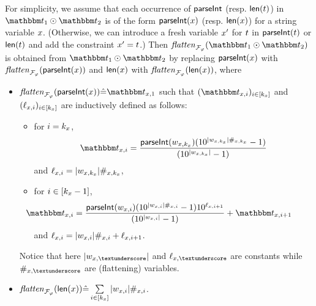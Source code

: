 For simplicity, we assume that each occurrence of $\textsf{parseInt}$ (resp. $\textsf{len}(t)$) in $\iterm_1 \op \iterm_2$ is of the form $\textsf{parseInt}(x)$ (resp. $\textsf{len}(x)$) for a string variable $x$. (Otherwise, we can introduce a fresh variable $x'$ for $t$ in $\textsf{parseInt}(t)$ or $\textsf{len}(t)$ and add the constraint $x' = t$.)
Then $\flatten_{\flatfun_\varphi}(\iterm_1 \op \iterm_2)$ is obtained from $\iterm_1 \op \iterm_2$ by replacing $\textsf{parseInt}(x)$ with $\mathit{flatten}_{\mathcal{F}_\varphi}(\textsf{parseInt}(x))$ and $\textsf{len}(x)$ with $\mathit{flatten}_{\mathcal{F}_\varphi}(\textsf{len}(x))$, where 
\begin{itemize}
\item 
$\flatten_{\flatfun_\varphi}(\parseInt(\svarx)) \Def \iterm_{\svarx,1}$  such that $(\iterm_{\svarx, i})_{i \in [k_\svarx]}$ and $(\ell_{x, i})_{i \in [k_x]}$ are inductively defined as follows: 
\begin{itemize}
\item for $i = k_x$, 
$$\iterm_{\svarx, i} = \frac{\parseInt(w_{\svarx, k_\svarx}) (10^{\vert w_{\svarx,k_\svarx}\vert  \#_{\svarx, k_\svarx} } -1 )}{(10^{\vert w_{\svarx, k_\svarx}\vert } -1 )}$$ 
and $\ell_{x, i} = \vert w_{x,k_x}\vert  \#_{x, k_x}$,
%
\item for $i \in [k_x-1]$, 
%
$$ \hspace{-1.2cm} \iterm_{\svarx, i} =  \frac{\parseInt(w_{\svarx, i}) (10^{\vert w_{\svarx, i} \vert  \#_{\svarx, i} } -1 ) 10^{\ell_{\svarx, i+1}}} {(10^{\vert w_{\svarx, i}\vert } -1 )} + \iterm_{\svarx, i+1}$$
%
and $\ell_{x, i} = \vert w_{x, i} \vert  \#_{x, i} + \ell_{x, i+1}$.
%
\end{itemize}
Notice that here $\vert w_{\svarx, \textunderscore } \vert $ and $\ell_{\svarx, \textunderscore}$ are constants while $\#_{\svarx, \textunderscore}$ are (flattening) variables.
%
\item $\mathit{flatten}_{\mathcal{F}_\varphi}(\textsf{len}(x)) \hat{=} \sum \limits_{i \in [k_{x}]} \vert w_{x, i} \vert  \#_{x, i}$. 
\end{itemize} 



